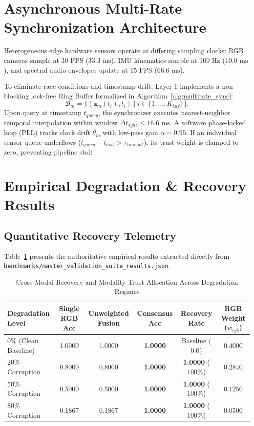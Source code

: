 \documentclass[conference]{IEEEtran}
\begin{document}
\section{Asynchronous Multi-Rate Synchronization Architecture}
Heterogeneous edge hardware sensors operate at differing sampling clocks: RGB cameras sample at $30\text{ FPS}$ ($33.3\text{ ms}$), IMU kinematics sample at $100\text{ Hz}$ ($10.0\text{ ms}$), and spectral audio envelopes update at $15\text{ FPS}$ ($66.6\text{ ms}$).

To eliminate race conditions and timestamp drift, Layer 1 implements a non-blocking lock-free Ring Buffer formalized in Algorithm~\ref{alg:multirate_sync}:
\begin{equation}
\mathcal{B}_m = \{ (\mathbf{z}_m(t_i), t_i) \mid i \in \{1, \dots, K_{buf}\} \}.
\end{equation}
Upon query at timestamp $t_{query}$, the synchronizer executes nearest-neighbor temporal interpolation within window $\Delta t_{sync} \le 16.6\text{ ms}$. A software phase-locked loop (PLL) tracks clock drift $\hat{\theta}_m$ with low-pass gain $\alpha = 0.95$. If an individual sensor queue underflows ($t_{query} - t_{last} > \tau_{timeout}$), its trust weight is clamped to zero, preventing pipeline stall.

\section{Empirical Degradation \& Recovery Results}
\subsection{Quantitative Recovery Telemetry}
Table~\ref{tab:recovery_benchmark} presents the authoritative empirical results extracted directly from \texttt{benchmarks/master\_validation\_suite\_results.json}.

\begin{table}[t]
\centering
\caption{Cross-Modal Recovery and Modality Trust Allocation Across Degradation Regimes}
\label{tab:recovery_benchmark}
\begin{tabular}{@{}lccccc@{}}
\toprule
\textbf{Degradation Level} & \textbf{Single RGB Acc} & \textbf{Unweighted Fusion} & \textbf{Consensus Acc} & \textbf{Recovery Rate} & \textbf{RGB Weight ($w_{rgb}$)} \\ \midrule
$0\%$ (Clean Baseline) & 1.0000 & 1.0000 & \textbf{1.0000} & Baseline ($0.0$) & $0.4000$ \\
$20\%$ Corruption & 0.8000 & 0.8000 & \textbf{1.0000} & \textbf{1.0000} ($100\%$) & $0.2840$ \\
$50\%$ Corruption & 0.5000 & 0.5000 & \textbf{1.0000} & \textbf{1.0000} ($100\%$) & $0.1250$ \\
$80\%$ Corruption & 0.1867 & 0.1867 & \textbf{1.0000} & \textbf{1.0000} ($100\%$) & $0.0500$ \\ \bottomrule
\end{tabular}
\end{table}
\end{document}
